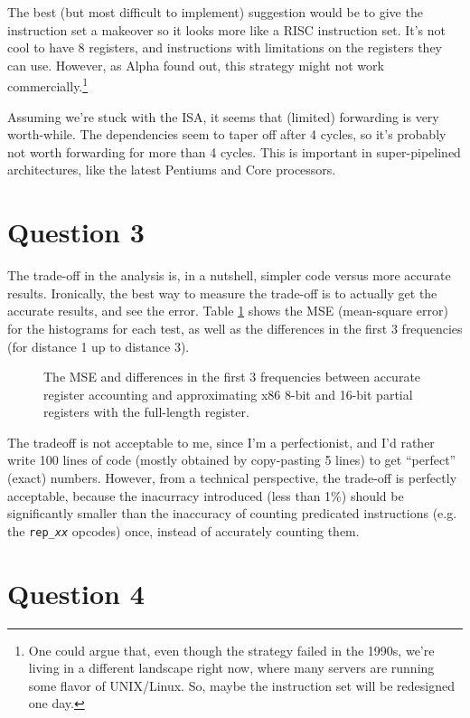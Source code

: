 The best (but most difficult to implement) suggestion would be to give the
instruction set a makeover so it looks more like a RISC instruction set. It's
not cool to have 8 registers, and instructions with limitations on the registers
they can use. However, as Alpha found out, this strategy might not work
commercially.\footnote{One could argue that, even though the strategy failed in
the 1990s, we're living in a different landscape right now, where many servers
are running some flavor of UNIX/Linux. So, maybe the instruction set will be
redesigned one day.}

Assuming we're stuck with the ISA, it seems that (limited) forwarding is very
worth-while. The dependencies seem to taper off after 4 cycles, so it's
probably not worth forwarding for more than 4 cycles. This is important in
super-pipelined architectures, like the latest Pentiums and Core processors.

\section{Question 3}
The trade-off in the analysis is, in a nutshell, simpler code versus more
accurate results. Ironically, the best way to measure the trade-off is to
actually get the accurate results, and see the error. Table \ref{q3:mse} shows
the MSE (mean-square error) for the histograms for each test, as well as the
differences in the first 3 frequencies (for distance 1 up to distance 3).

\begin{figure}[htb]
\center

\caption{The MSE and differences in the first 3 frequencies between accurate
register accounting and approximating x86 8-bit and 16-bit partial registers
with the full-length register. }
\label{q3:mse}
\end{figure}

The tradeoff is not acceptable to me, since I'm a perfectionist, and I'd rather
write 100 lines of code (mostly obtained by copy-pasting 5 lines) to get
``perfect'' (exact) numbers.  However, from a technical perspective, the
trade-off is perfectly acceptable, because the inacurracy introduced (less than
1\%) should be significantly smaller than the inaccuracy of counting predicated
instructions (e.g. the \texttt{rep\_\textit{xx}} opcodes) once, instead of
accurately counting them.

\section{Question 4}

